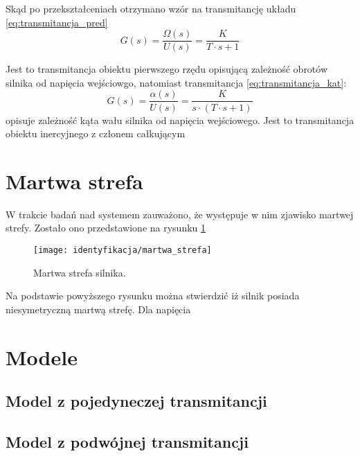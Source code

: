  Skąd po przekształceniach otrzymano wzór na transmitancję układu \ref{eq:transmitancja_pred}
\begin{equation}
\label{eq:transmitancja_pred}
G(s) = \frac{\Omega(s)}{U(s)} = \frac{K}{T \cdot s + 1}
\end{equation}

Jest to transmitancja obiektu pierwszego rzędu opisującą zależność obrotów silnika od napięcia wejściowgo, natomiast transmitancja \ref{eq:transmitancja_kat}:
\begin{equation}
\label{eq:transmitancja_kat}
G(s) = \frac{\alpha(s)}{U(s)} = \frac{ K}{s \cdot (T \cdot s + 1)}
\end{equation}
opisuje zależność kąta wału silnika od napięcia wejściowego. Jest to transmitancja obiektu inercyjnego z członem całkującym

\section{Martwa strefa}
W trakcie badań nad systemem zauważono, że występuje w nim zjawisko martwej strefy. Zostało ono przedstawione na rysunku \ref{fig:martwa_sterfa}
\begin{figure}[H]
	
	\texttt{[image: identyfikacja/martwa\_strefa]}
	\centering
	\caption{Martwa strefa silnika.}
	\label{fig:martwa_sterfa}
\end{figure}

Na podstawie powyższego rysunku można stwierdzić iż silnik posiada niesymetryczną martwą strefę. Dla napięcia 
\section{Modele}
\subsection*{Model z pojedyneczej transmitancji}
\subsection*{Model z podwójnej transmitancji}
